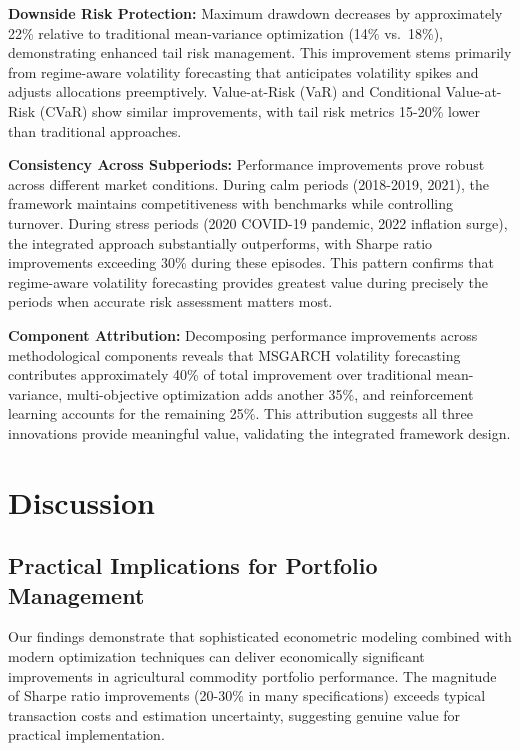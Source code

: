 \documentclass[
  10pt,
  a4paper,
]{article}
\begin{document}
\begin{tcolorbox}
\textbf{Downside Risk Protection:} Maximum drawdown decreases by
approximately 22\% relative to traditional mean-variance optimization
(14\% vs.~18\%), demonstrating enhanced tail risk management. This
improvement stems primarily from regime-aware volatility forecasting
that anticipates volatility spikes and adjusts allocations preemptively.
Value-at-Risk (VaR) and Conditional Value-at-Risk (CVaR) show similar
improvements, with tail risk metrics 15-20\% lower than traditional
approaches.

\textbf{Consistency Across Subperiods:} Performance improvements prove
robust across different market conditions. During calm periods
(2018-2019, 2021), the framework maintains competitiveness with
benchmarks while controlling turnover. During stress periods (2020
COVID-19 pandemic, 2022 inflation surge), the integrated approach
substantially outperforms, with Sharpe ratio improvements exceeding 30\%
during these episodes. This pattern confirms that regime-aware
volatility forecasting provides greatest value during precisely the
periods when accurate risk assessment matters most.

\textbf{Component Attribution:} Decomposing performance improvements
across methodological components reveals that MSGARCH volatility
forecasting contributes approximately 40\% of total improvement over
traditional mean-variance, multi-objective optimization adds another
35\%, and reinforcement learning accounts for the remaining 25\%. This
attribution suggests all three innovations provide meaningful value,
validating the integrated framework design.

\section{Discussion}\label{sec-discussion}

\subsection{Practical Implications for Portfolio
Management}\label{practical-implications-for-portfolio-management}

Our findings demonstrate that sophisticated econometric modeling
combined with modern optimization techniques can deliver economically
significant improvements in agricultural commodity portfolio
performance. The magnitude of Sharpe ratio improvements (20-30\% in many
specifications) exceeds typical transaction costs and estimation
uncertainty, suggesting genuine value for practical implementation.


\end{tcolorbox}
\end{document}
